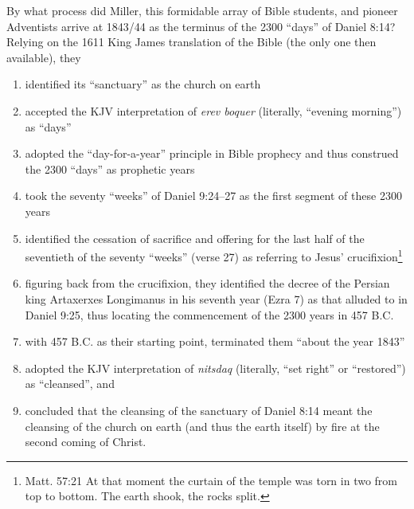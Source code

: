 By what process did Miller, this formidable array of Bible students, and
pioneer Adventists arrive at 1843/44 as the terminus of the 2300 ``days'' of
Daniel 8:14? Relying on the 1611 King James translation of the Bible (the
only one then available), they
\begin{enumerate}
    \item identified its ``sanctuary'' as the church on earth
    \item accepted the KJV interpretation of \textit{erev boquer} (literally, ``evening
        morning'') as ``days''
    \item adopted the ``day-for-a-year'' principle in Bible prophecy and thus
        construed the 2300 ``days'' as prophetic years
    \item took the seventy ``weeks'' of Daniel 9:24--27 as the first segment of
        these 2300 years
    \item identified the cessation of sacrifice and offering for the last half
        of the seventieth of the seventy ``weeks'' (verse 27) as referring to
        Jesus' crucifixion\footnote{Matt. 57:21 At that moment the curtain of
        the temple was torn in two from top to bottom. The earth shook, the
        rocks split.}
    \item figuring back from the crucifixion, they identified the decree of the
        Persian king Artaxerxes Longimanus in his seventh year (Ezra 7) as that
        alluded to in Daniel 9:25, thus locating the commencement of the 2300
        years in 457 B.C.
    \item with 457 B.C. as their starting point, terminated them ``about the
        year 1843''
    \item adopted the KJV interpretation of \textit{nitsdaq} (literally, ``set right''
        or ``restored'') as ``cleansed'', and 
    \item concluded that the cleansing of the sanctuary of Daniel 8:14
        meant the cleansing of the church on earth (and thus the earth
        itself) by fire at the second coming of Christ.
\end{enumerate}


